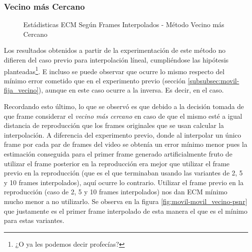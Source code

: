 \subsubsection{Vecino m\'as Cercano}

\begin{figure}[H]
    \centering
    \caption{Est\'adisticas ECM Seg\'un Frames Interpolados - M\'etodo Vecino m\'as Cercano}
    \label{fig:movil-movil_vecino-mse_estadisticas}
\end{figure}

\par Los resultados obtenidos a partir de la experimentaci\'on de este m\'etodo
no difieren del caso previo para interpolaci\'on l\'ineal, cumpli\'endose las
hip\'otesis planteadas\footnote{¿O ya les podemos decir profec\'ias?}. E
incluso se puede observar que ocurre lo mismo respecto del m\'inimo error
cometido que en el experimento previo (secci\'on
\ref{subsubsec:movil-fija_vecino}), aunque en este caso ocurre a la inversa. Es
decir, en el caso.

\par Recordando esto \'ultimo, lo que se observ\'o es que debido a la decisi\'on
tomada de que frame considerar el \emph{vecino m\'as cercano} en caso de que el
mismo est\'e a igual distancia de reproducci\'on que los frames originales que
se usan calcular la interpolaci\'on. A diferencia del experimento previo, donde
al interpolar un \'unico frame por cada par de frames del video se obten\'ia un
error m\'inimo menor pues la estimaci\'on conseguida para el primer frame generado
artificialmente fruto de utilizar el frame posterior en
la reproducci\'on era mejor que utilizar el frame previo en la reproducci\'on (que
es el que terminaban usando las variantes de 2, 5 y 10 frames interpolados), aqu\'i
ocurre lo contrario. Utilizar el frame previo en la reproducci\'on (caso de 2, 5
y 10 frames interpolados) nos dan ECM m\'inimo mucho menor a no utilizarlo. Se
observa en la figura \ref{fig:movil-movil_vecino-psnr} que justamente es el
primer frame interpolado de esta manera el que es el m\'inimo para estas
variantes.

